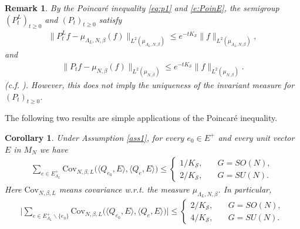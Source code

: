 \documentclass[11pt,UTF-8,reqno]{amsart}
\numberwithin{equation}{section}
\newtheorem{remark}[theorem]{Remark}
\newtheorem{corollary}[theorem]{Corollary}
\def\cov{{\mathrm{Cov}}}
\def\<{{\langle}}
\def\>{{\rangle}}
\def\cQ{{\mathcal Q}}
\def\cS{{\mathcal S}}
\def\geq{\geqslant}
\def\leq{\leqslant}
\def\<{{\langle}}
\def\>{{\rangle}}
\def\br{\begin{remark}}
\def\er{\end{remark}}
\def\bc{\begin{corollary}}
\def\ec{\end{corollary}}
\def\mfg{\mathfrak{g}}
\def\geq{\geqslant}
\def\leq{\leqslant}
\def\<{\langle} \def\>{\rangle}
\begin{document}
\br\label{re1} By the Poincar\'e inequality \eqref{eq:p1} and \eqref{e:PoinE}, the semigroup $(P_t^L)_{t\geq0}$ and  $(P_t)_{t\geq0}$ satisfy
\begin{align*}
\|	P_t^Lf-\mu_{\Lambda_L,N,\beta}(f)\|_{L^2(\mu_{\Lambda_L,N,\beta})}\leq e^{-tK_\cS }\|f\|_{L^2(\mu_{\Lambda_L,N,\beta})},
\end{align*}
and %
\begin{align*}
	\|	P_tf-\mu_{N,\beta}(f)\|_{L^2(\mu_{N,\beta})}\leq e^{-tK_\cS }\|f\|_{L^2(\mu_{N,\beta})}.
\end{align*}
(c.f. \cite[Theorem 1.1.1]{Wang}). However, this does not imply the uniqueness of the invariant measure for $(P_t)_{t\geq0}$.
\er


The following two results are simple applications of the Poincar\'e inequality. 

\bc\label{co:c}
Under Assumption \ref{ass1},
for every  %
$e_0\in E^+$ and every unit vector $E$ in $M_N$ %
we have
\begin{align*}
	\sum_{e\in E_{\Lambda_L}^+} \cov_{N,\beta,L}\Big(\<Q_{e_0},E\>,\<Q_e,E\>\Big)\leq  \begin{cases}
		1 / K_\cS ,&\quad G= SO(N),\\
		2/ K_\cS ,&\quad G=SU(N).
	\end{cases}
\end{align*}
Here $\cov_{N,\beta,L}$ means covariance w.r.t. the measure $\mu_{\Lambda_L,N,\beta}$.
In particular,
\begin{align*}
	\Big|\sum_{e\in E_{\Lambda_L}^+ \backslash\{e_0\}} \cov_{N,\beta,L}\Big(\<Q_{e_0},E\>,\<Q_e,E\>\Big)\Big|\leq \begin{cases}
		2 / K_\cS ,&\quad G= SO(N),\\
		4 / K_\cS ,&\quad G=SU(N).
	\end{cases}
\end{align*}
\ec
\end{document}

